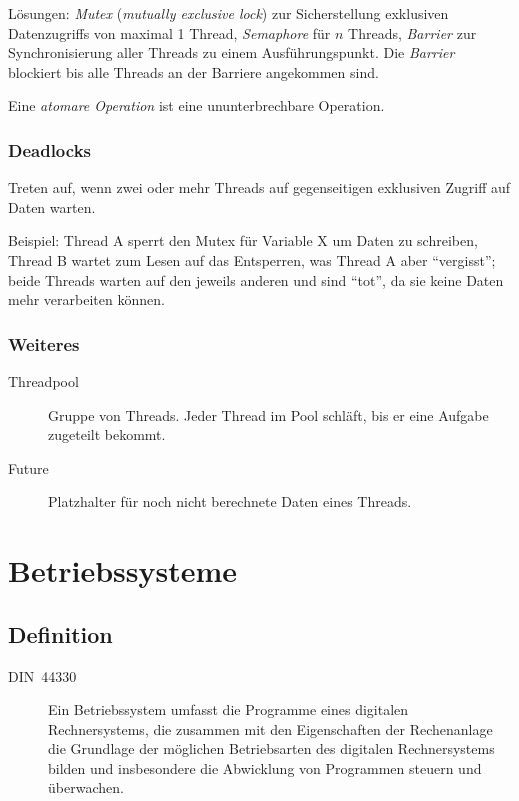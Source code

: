 Lösungen: \emph{Mutex} (\emph{mutually exclusive lock}) zur Sicherstellung exklusiven Datenzugriffs von maximal 1 Thread, \emph{Semaphore} für $n$ Threads, \emph{Barrier} zur Synchronisierung aller Threads zu einem Ausführungspunkt.
Die \emph{Barrier} blockiert bis alle Threads an der Barriere angekommen sind.

Eine \emph{atomare Operation} ist eine ununterbrechbare Operation.


\subsection{Deadlocks}


Treten auf, wenn zwei oder mehr Threads auf gegenseitigen exklusiven Zugriff auf Daten warten.

Beispiel: Thread A sperrt den Mutex für Variable X um Daten zu schreiben, Thread B wartet zum Lesen auf das Entsperren, was Thread A aber \enquote{vergisst}; beide Threads warten auf den jeweils anderen und sind \enquote{tot}, da sie keine Daten mehr verarbeiten können.


\subsection{Weiteres}
\begin{description}
  \item [{Threadpool}] 
	Gruppe von Threads. Jeder Thread im Pool schläft, bis er eine Aufgabe zugeteilt bekommt.
  \item [{Future}] 
	Platzhalter für noch nicht berechnete Daten eines Threads.
\end{description}



\chapter{Betriebssysteme}


\section{Definition}
\begin{description}
  \item [{DIN~44330}] 
	Ein Betriebssystem umfasst die Programme eines digitalen Rechnersystems, die zusammen mit den Eigenschaften der Rechenanlage die Grundlage der möglichen Betriebsarten des digitalen Rechnersystems bilden und insbesondere die Abwicklung von Programmen steuern und überwachen.
\end{description}

